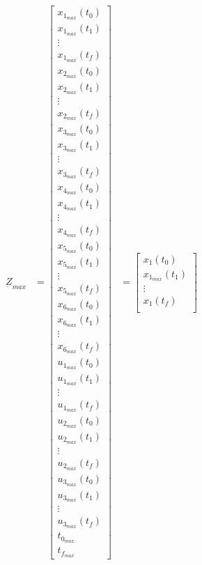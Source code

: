 \documentclass[11pt,usenames]{article}
\begin{document}
	\begin{align}
	\underbar Z_{max} &= 
	\begin{bmatrix}
	x_{1_{max}}(t_{0}) \\ x_{1_{max}}(t_{1}) \\  \vdots \\  x_{1_{max}}(t_{f}) \\  
	x_{2_{max}}(t_{0}) \\ x_{2_{max}}(t_{1}) \\ \vdots \\  x_{2_{max}}(t_{f}) \\ 
	x_{3_{max}}(t_{0}) \\ x_{3_{max}}(t_{1}) \\ \vdots \\  x_{3_{max}}(t_{f}) \\ 
	x_{4_{max}}(t_{0}) \\ x_{4_{max}}(t_{1}) \\ \vdots \\  x_{4_{max}}(t_{f}) \\ 
	x_{5_{max}}(t_{0}) \\ x_{5_{max}}(t_{1}) \\ \vdots \\  x_{5_{max}}(t_{f}) \\
	x_{6_{max}}(t_{0}) \\ x_{6_{max}}(t_{1}) \\ \vdots \\  x_{6_{max}}(t_{f}) \\
	u_{1_{max}}(t_{0}) \\ u_{1_{max}}(t_{1}) \\ \vdots \\  u_{1_{max}}(t_{f}) \\ 
	u_{2_{max}}(t_{0}) \\ u_{2_{max}}(t_{1}) \\ \vdots \\  u_{2_{max}}(t_{f}) \\ 
	u_{3_{max}}(t_{0}) \\ u_{3_{max}}(t_{1}) \\ \vdots \\  u_{3_{max}}(t_{f}) \\ 
	t_{0_{max}} \\ 
	t_{f_{max}}  
	\end{bmatrix}
	&=
	\begin{bmatrix}
	x_{1}(t_{0}) \\ x_{1_{max}}(t_{1}) \\ \vdots \\  x_{1}(t_{f}) \\  

\end{bmatrix}
\end{align}
\end{document}
